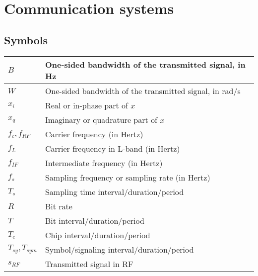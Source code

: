 \documentclass{article}
\begin{document}
\section{Communication systems}
\subsection{Symbols}
\begin{xltabular}{\textwidth}{XX}
	\(B\)                 & One-sided bandwidth of the transmitted signal, in Hz                              \\ \hline
	\(W\)                 & One-sided bandwidth of the transmitted signal, in rad/s                           \\ \hline
	\(x_i\)               & Real or in-phase part of \(x\)                                                    \\ \hline
	\(x_q\)               & Imaginary or quadrature part of \(x\)                                             \\ \hline
	\(f_c, f_{RF}\)       & Carrier frequency (in Hertz)                                                      \\ \hline
	\(f_L\)               & Carrier frequency in L-band (in Hertz)                                            \\ \hline
	\(f_{IF}\)            & Intermediate frequency (in Hertz)                                                 \\ \hline
	\(f_{s}\)             & Sampling frequency or sampling rate (in Hertz)                                    \\ \hline
	\(T_{s}\)             & Sampling time interval/duration/period                                            \\ \hline
	\(R\)                 & Bit rate                                                                          \\ \hline
	\(T\)                 & Bit interval/duration/period                                                      \\ \hline
	\(T_c\)               & Chip interval/duration/period                                                     \\ \hline
	\(T_{sy}, T_{sym}\)   & Symbol/signaling\cite{proakisDigitalCommunications2007} interval/duration/period  \\ \hline
	\(s_{RF}\)            & Transmitted signal in RF                                                          \\ \hline

\end{xltabular}
\end{document}

